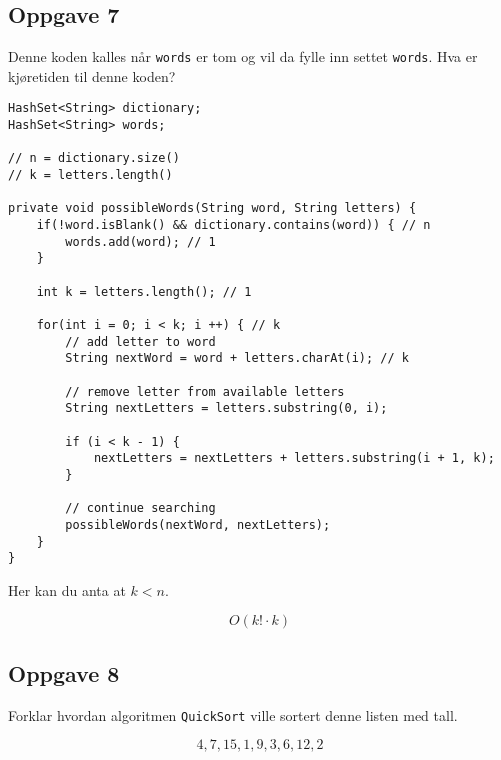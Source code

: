 \documentclass{article}
\begin{document}
    \subsection{Oppgave 7}
    Denne koden kalles når \texttt{words} er tom og vil da fylle inn settet \texttt{words}. Hva er kjøretiden til denne koden?

    \begin{lstlisting}
HashSet<String> dictionary;        
HashSet<String> words;

// n = dictionary.size()
// k = letters.length()

private void possibleWords(String word, String letters) {
    if(!word.isBlank() && dictionary.contains(word)) { // n
        words.add(word); // 1
    }

    int k = letters.length(); // 1

    for(int i = 0; i < k; i ++) { // k
        // add letter to word
        String nextWord = word + letters.charAt(i); // k

        // remove letter from available letters
        String nextLetters = letters.substring(0, i); 

        if (i < k - 1) {
            nextLetters = nextLetters + letters.substring(i + 1, k);
        }

        // continue searching
        possibleWords(nextWord, nextLetters);
    }
}
    \end{lstlisting}

    Her kan du anta at \( k < n \).

    \begin{ans}
        \[ O\left( k! \cdot  k  \right) \]
        
    \end{ans}

    \subsection{Oppgave 8}
    Forklar hvordan algoritmen \texttt{QuickSort} ville sortert denne listen med tall.

    \[ 4,7,15,1,9,3,6,12,2 \]
\end{document}
